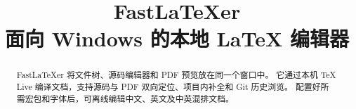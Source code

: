 \documentclass[UTF8,fontset=fandol,a4paper,twocolumn,zihao=5]{ctexart}
\title{\bfseries FastLaTeXer\\[.4em]
  \large 面向 Windows 的本地 LaTeX 编辑器}
\author{}
\date{}
\begin{document}
\maketitle

\begin{abstract}
FastLaTeXer 将文件树、源码编辑器和 PDF 预览放在同一个窗口中。
它通过本机 TeX Live 编译文档，支持源码与 PDF 双向定位、项目内补全和 Git 历史浏览。
配置好所需宏包和字体后，可离线编辑中文、英文及中英混排文档。
\end{abstract}




\end{document}
